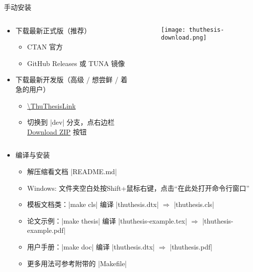 \begin{frame}[fragile]{手动安装\ThuThesis{}}
      \begin{columns}
        \begin{column}{.7\textwidth}
  \begin{itemize}
    \item 下载最新正式版（推荐）
      \begin{itemize}
        \item CTAN 官方 
        \item GitHub Releases  或 TUNA 镜像 
      \end{itemize}
    \item 下载最新开发版（高级 / 想尝鲜 / 着急的用户）
      \begin{itemize}
        \item \url{\ThuThesisLink}
        \item 切换到 |dev| 分支，点右边栏
          \href{\ThuThesisLink/archive/dev.zip}%
          {Download ZIP} 按钮
      \end{itemize}
  \end{itemize}
        \end{column}
        \begin{column}{.3\textwidth}
          \begin{figure}[htbp]
            \centering
            \texttt{[image: thuthesis-download.png]}
          \end{figure}
        \end{column}
      \end{columns}
  \begin{itemize}
    \item 编译与安装
      \begin{itemize}
        \item 解压缩看文档 |README.md|
        \item Windows: 文件夹空白处按Shift+鼠标右键，点击“在此处打开命令行窗口”
        \item 模板文档类：|make cls| 编译 |thuthesis.dtx| $\Rightarrow$
          |thuthesis.cls|
        \item 论文示例：|make thesis| 编译 |thuthesis-example.tex| $\Rightarrow$
        |thuthesis-example.pdf|
        \item 用户手册：|make doc| 编译 |thuthesis.dtx| $\Rightarrow$
          |thuthesis.pdf|
        \item 更多用法可参考附带的 |Makefile|
      \end{itemize}
  \end{itemize}
\end{frame}


